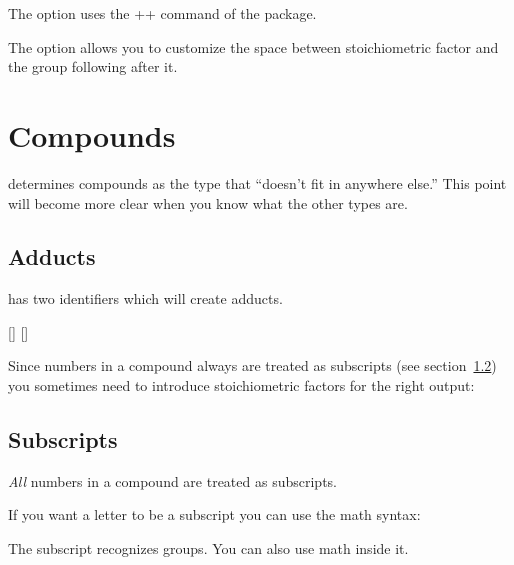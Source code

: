 \documentclass[load-preamble+]{cnltx-doc}
\begin{document}
The option  uses the \verbcode+\nicefrac+ command
of the  package.
\begin{example}
   
\end{example}

The option  allows you to customize the space between
stoichiometric factor and the group following after it.
\begin{example}
   \par
\end{example}

\section{Compounds}\label{ssec:compounds}
\chemformula{} determines compounds as the type that ``doesn't fit in anywhere
else.''  This point will become more clear when you know what the other types
are.
\begin{example}
   \par
\end{example}

\subsection{Adducts}
\chemformula{} has two identifiers which will create adducts.
\begin{commands}
  [] 
  [] 
\end{commands}
\begin{example}
   \par
\end{example}
Since numbers in a compound always are treated as subscripts (see
section~\ref{ssec:subscripts}) you sometimes need to introduce stoichiometric
factors for the right output:
\begin{example}
   \par
   \par
\end{example}

\subsection{Subscripts}\label{ssec:subscripts}
\emph{All} numbers in a compound are treated as subscripts.
\begin{example}
\end{example}
If you want a letter to be a subscript you can use the math syntax:
\begin{example}
\end{example}
The subscript recognizes groups. You can also use math inside it.
\begin{example}
   \par
\end{example}
\end{document}
